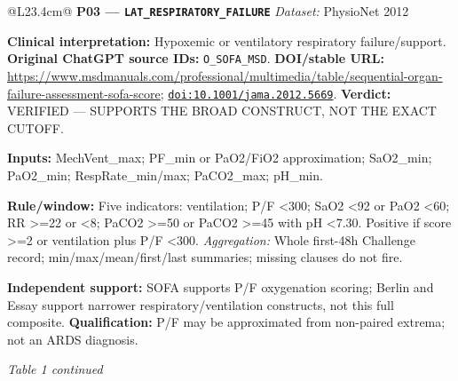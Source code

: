 \begin{tabular}{@{}L{23.4cm}@{}}
\addlinespace[3pt]
\midrule
\textbf{P03 --- \nolinkurl{LAT_RESPIRATORY_FAILURE}} \hfill \textit{Dataset:} PhysioNet 2012\par\textbf{Clinical interpretation:} Hypoxemic or ventilatory respiratory failure/support. \textbf{Original ChatGPT source IDs:} \nolinkurl{O_SOFA_MSD}. \textbf{DOI/stable URL:} \url{https://www.msdmanuals.com/professional/multimedia/table/sequential-organ-failure-assessment-sofa-score}; \allowbreak \href{https://doi.org/10.1001/jama.2012.5669}{\nolinkurl{doi:10.1001/jama.2012.5669}}. \textbf{Verdict:} VERIFIED --- SUPPORTS THE BROAD CONSTRUCT, NOT THE EXACT CUTOFF.\par\textbf{Inputs:} MechVent\_max; PF\_min or PaO2/FiO2 approximation; SaO2\_min; PaO2\_min; RespRate\_min/max; PaCO2\_max; pH\_min.\par\textbf{Rule/window:} Five indicators: ventilation; P/F <300; SaO2 <92 or PaO2 <60; RR >=22 or <8; PaCO2 >=50 or PaCO2 >=45 with pH <7.30. Positive if score >=2 or ventilation plus P/F <300. \textit{Aggregation:} Whole first-48h Challenge record; min/max/mean/first/last summaries; missing clauses do not fire.\par\textbf{Independent support:} SOFA supports P/F oxygenation scoring; Berlin and Essay support narrower respiratory/ventilation constructs, not this full composite. \textbf{Qualification:} P/F may be approximated from non-paired extrema; not an ARDS diagnosis. \\
\addlinespace[3pt]
\midrule
\bottomrule
\end{tabular}
\clearpage
\textit{Table 1 continued}\par
